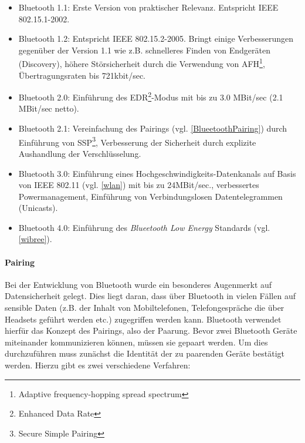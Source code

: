             \begin{itemize}
                \item{Bluetooth 1.1:} Erste Version von praktischer Relevanz. Entspricht 
                                      IEEE 802.15.1-2002.
                \item{Bluetooth 1.2:} Entspricht IEEE 802.15.2-2005. Bringt einige Verbesserungen
                                      gegenüber der Version 1.1 wie z.B. schnelleres Finden
                                      von Endgeräten (Discovery), höhere Störsicherheit durch
                                      die Verwendung von AFH\footnote{Adaptive frequency-hopping spread spectrum},
                                      Übertragungsraten bis 721kbit/sec.
                \item{Bluetooth 2.0:} Einführung des EDR\footnote{Enhanced Data Rate}-Modus mit bis zu
                                      3.0 MBit/sec (2.1 MBit/sec netto).
                \item{Bluetooth 2.1:} Vereinfachung des Pairings (vgl. \ref{BlueetoothPairing}) durch 
                                      Einführung von SSP\footnote{Secure Simple Pairing}, Verbesserung
                                      der Sicherheit durch explizite Aushandlung der Verschlüsselung.
                \item{Bluetooth 3.0:} Einführung eines Hochgeschwindigkeits-Datenkanals auf Basis von
                                      IEEE 802.11 (vgl. \ref{wlan}) mit bis zu 24MBit/sec., verbessertes
                                      Powermanagement, Einführung von Verbindungslosen Datentelegrammen
                                      (Unicasts).
                \item{Bluetooth 4.0:} Einführung des \textsl{Blueetooth Low Energy} Standards (vgl. \ref{wibree}).
            \end{itemize}

        \paragraph{Pairing}\label{BluetoothPairing}
            Bei der Entwicklung von Bluetooth wurde ein besonderes Augenmerkt auf Datensicherheit gelegt. 
            Dies liegt daran, dass über Bluetooth in vielen Fällen auf sensible Daten (z.B. der Inhalt
            von Mobiltelefonen, Telefongespräche die über Headsets geführt werden etc.) zugegriffen
            werden kann. Bluetooth verwendet hierfür das Konzept des Pairings, also der Paarung. Bevor zwei 
            Bluetooth Geräte miteinander kommunizieren können, müssen sie gepaart werden. Um dies 
            durchzuführen muss zunächst die Identität der zu paarenden Geräte bestätigt werden.
            Hierzu gibt es zwei verschiedene Verfahren:

